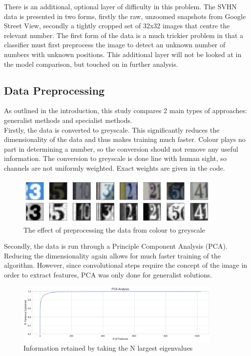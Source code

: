 \documentclass[12pt]{article}
\begin{document}
There is an additional, optional layer of difficulty in this problem. The SVHN data is presented in two forms, firstly the raw, unzoomed snapshots from Google Street View, secondly a tightly cropped set of 32x32 images that centre the relevant number. The first form of the data is a much trickier problem in that a classifier must first preprocess the image to detect an unknown number of numbers with unknown positions. This additional layer will not be looked at in the model comparison, but touched on in further analysis.\\

\subsection{Data Preprocessing}
As outlined in the introduction, this study compares 2 main types of approaches: generalist methods and specialist methods.\\

Firstly, the data is converted to greyscale. This significantly reduces the dimensionality of the data and thus makes training much faster. Colour plays no part in determining a number, so the conversion should not remove any useful information. The conversion to greyscale is done line with human sight, so channels are not uniformly weighted. Exact weights are given in the code.\\
\begin{figure}[h]
\caption{The effect of preprocessing the data from colour to greyscale}
\centering
\includegraphics[width=0.9\textwidth]{images/colour_to_greyscale.png}
\end{figure}

Secondly, the data is run through a Principle Component Analysis (PCA). Reducing the dimensionality again allows for much faster training of the algorithm. However, since convolutional steps require the concept of the image in order to extract features, PCA was only done for generalist solutions.\\
\begin{figure}[h]
\caption{Information retained by taking the N largest eigenvalues}
\centering
\includegraphics[width=0.9\textwidth]{images/pca_information_retention.png}
\end{figure}
\end{document}
